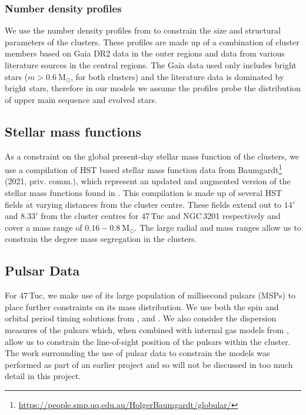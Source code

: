 \subsubsection{Number density profiles}
We use the number density profiles from \citet{DeBoer2019} to constrain the size and structural
parameters of the clusters. These profiles are made up of a combination of cluster members based on
Gaia DR2 data in the outer regions and data from various literature sources in the central regions.
The Gaia data used only includes bright stars ($m > 0.6 \ \mathrm{M}_\odot$, for both clusters) and
the literature data is dominated by bright stars, therefore in our models we assume the profiles
probe the distribution of upper main sequence and evolved stars.

\subsection{Stellar mass functions}

As a constraint on the global present-day stellar mass function of the clusters, we use a
compilation of HST based stellar mass function data from
Baumgardt\footnote{\url{https://people.smp.uq.edu.au/HolgerBaumgardt/globular/}} (2021, priv.
comm.), which represent an updated and augmented version of the stellar mass functions found in
\citet{Sollima2017}. This compilation is made up of several HST fields at varying distances from the
cluster centre. These fields extend out to $14 '$ and $8.33 '$ from the cluster centres for 47\,Tuc
and NGC\,3201 respectively and cover a mass range of $0.16 - 0.8 \ \mathrm{M}_\odot$. The large
radial and mass ranges allow us to constrain the degree mass segregation in the clusters.

\subsection{Pulsar Data}

For 47\,Tuc, we make use of its large population of millisecond pulsars (MSPs) to place further
constraints on its mass distribution. We use both the spin and orbital period timing solutions from
\citet{Freire2017}, \citet{Ridolfi2016} and \citet{Freire2018}. We also consider the dispersion
measures of the pulsars which, when combined with internal gas models from \citet{Abbate2018}, allow
us to constrain the line-of-sight position of the pulsars within the cluster. The work surrounding
the use of pulsar data to constrain the models was performed as part of an earlier project and so
will not be discussed in too much detail in this project.



